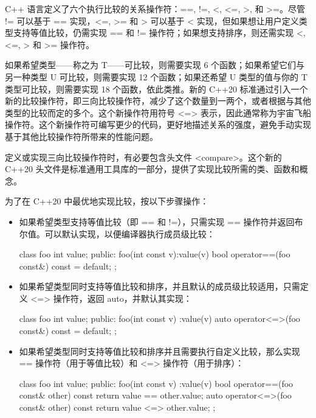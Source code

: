 
C++ 语言定义了六个执行比较的关系操作符：==, !=, <, <=, >, 和 >=。尽管 != 可以基于 == 实现，<=, >= 和 > 可以基于 < 实现，但如果想让用户定义类型支持等值比较，仍需实现 == 和 != 操作符；如果想支持排序，则还需实现 <, <=, > 和 >= 操作符。

如果希望类型——称之为 T——可比较，则需要实现 6 个函数；如果希望它们与另一种类型 U 可比较，则需要实现 12 个函数；如果还希望 U 类型的值与你的 T 类型可比较，则需要实现 18 个函数，依此类推。新的 C++20 标准通过引入一个新的比较操作符，即三向比较操作符，减少了这个数量到一两个，或者根据与其他类型的比较而定的多个。这个新操作符用符号 <=> 表示，因此通常称为宇宙飞船操作符。这个新操作符可编写更少的代码，更好地描述关系的强度，避免手动实现基于其他比较操作符所带来的性能问题。


定义或实现三向比较操作符时，有必要包含头文件 <compare>。这个新的 C++20 头文件是标准通用工具库的一部分，提供了实现比较所需的类、函数和概念。


为了在 C++20 中最优地实现比较，按以下步骤操作：

\begin{itemize}
\item
如果希望类型支持等值比较（即 == 和 !=），只需实现 == 操作符并返回布尔值。可以默认实现，以便编译器执行成员级比较：

\begin{cpp}
class foo
{
    int value;
public:
    foo(int const v):value(v){}
    bool operator==(foo const&) const = default;
};
\end{cpp}

\item
如果希望类型同时支持等值比较和排序，并且默认的成员级比较适用，只需定义 <=> 操作符，返回 auto，并默认其实现：

\begin{cpp}
class foo
{
    int value;
public:
    foo(int const v) :value(v) {}
    auto operator<=>(foo const&) const = default;
};
\end{cpp}

\item
如果希望类型同时支持等值比较和排序并且需要执行自定义比较，那么实现 == 操作符（用于等值比较）和 <=> 操作符（用于排序）：

\begin{cpp}
class foo
{
    int value;
public:
    foo(int const v) :value(v) {}
    bool operator==(foo const& other) const
    { return value == other.value; }
    auto operator<=>(foo const& other) const
    { return value <=> other.value; }
};
\end{cpp}
\end{itemize}

